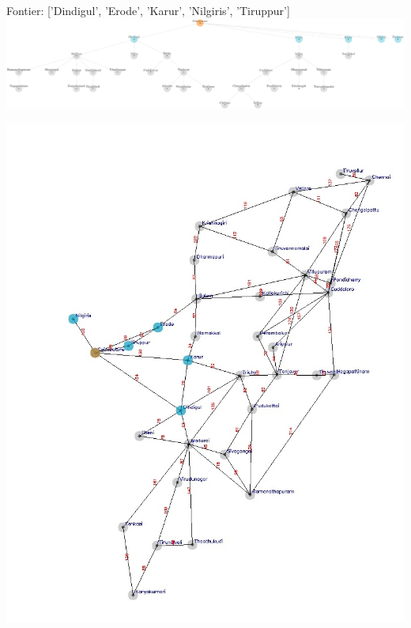 \documentclass[xcolor=table]{beamer}
\begin{document}
\begin{frame}
  { \tiny Fontier: ['Dindigul', 'Erode', 'Karur', 'Nilgiris', 'Tiruppur'] }
  \includegraphics[width=1\textwidth]{../BFSNodes/3-1.png}
  \begin{center}
    \includegraphics[height=0.6\textheight]{../BFSoutput/tamilBFS1.jpg}
  \end{center}
\end{frame}
\end{document}
